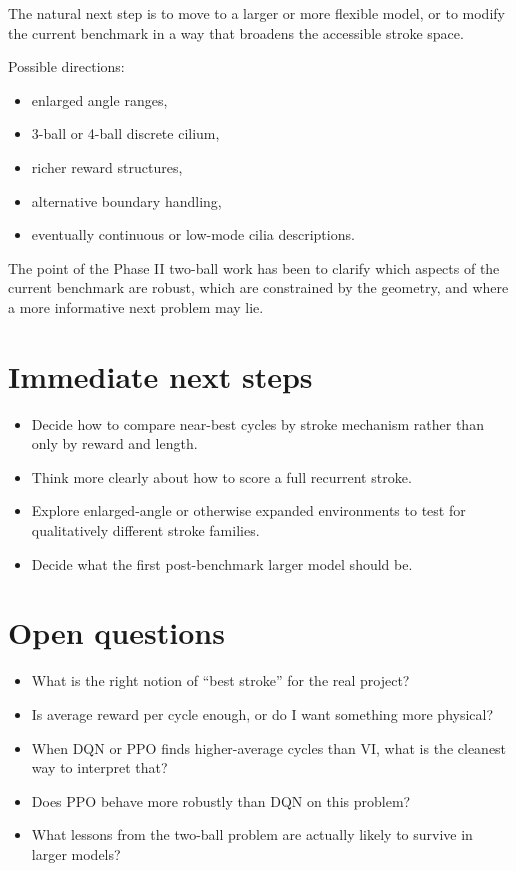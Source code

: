 \documentclass{article}
\begin{document}
The natural next step is to move to a larger or more flexible model, or to modify the current benchmark in a way that broadens the accessible stroke space.

Possible directions:
\begin{itemize}
    \item enlarged angle ranges,
    \item 3-ball or 4-ball discrete cilium,
    \item richer reward structures,
    \item alternative boundary handling,
    \item eventually continuous or low-mode cilia descriptions.
\end{itemize}

The point of the Phase II two-ball work has been to clarify which aspects of the current benchmark are robust, which are constrained by the geometry, and where a more informative next problem may lie.

\section{Immediate next steps}

\begin{itemize}
    \item Decide how to compare near-best cycles by stroke mechanism rather than only by reward and length.
    \item Think more clearly about how to score a full recurrent stroke.
    \item Explore enlarged-angle or otherwise expanded environments to test for qualitatively different stroke families.
    \item Decide what the first post-benchmark larger model should be.
\end{itemize}

\section{Open questions}

\begin{itemize}
    \item What is the right notion of ``best stroke'' for the real project?
    \item Is average reward per cycle enough, or do I want something more physical?
    \item When DQN or PPO finds higher-average cycles than VI, what is the cleanest way to interpret that?
    \item Does PPO behave more robustly than DQN on this problem?
    \item What lessons from the two-ball problem are actually likely to survive in larger models?
\end{itemize}
\end{document}
